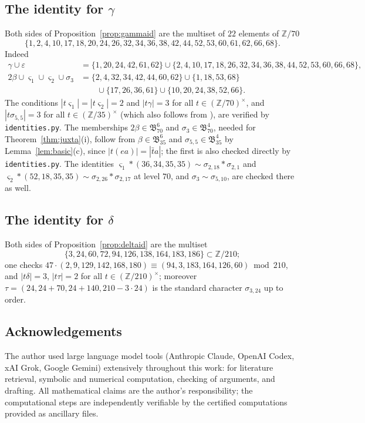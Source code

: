 \documentclass[11pt]{amsart}
\theoremstyle{definition}
\theoremstyle{remark}
\numberwithin{equation}{section}
\newcommand{\Z}{\mathbb{Z}}
\newcommand{\fB}{\mathfrak{B}}
\begin{document}
\subsection{\texorpdfstring{The identity for $\gamma$}{The identity for gamma}}
Both sides of Proposition~\ref{prop:gammaid} are the multiset of $22$ elements of $\Z/70$
\begin{equation}\label{eq:gammaid}
\{1,2,4,10,17,18,20,24,26,32,34,36,38,42,44,52,53,60,61,62,66,68\}.
\end{equation}
Indeed
\begin{align*}
\gamma\cup\varepsilon&=\{1,20,24,42,61,62\}\cup\{2,4,10,17,18,26,32,34,36,38,44,52,53,60,66,68\},\\
2\beta\cup\varsigma_1\cup\varsigma_2\cup\sigma_3&=\{2,4,32,34,42,44,60,62\}\cup\{1,18,53,68\}\\
&\qquad\cup\{17,26,36,61\}\cup\{10,20,24,38,52,66\}.
\end{align*}
The conditions $|t\varsigma_1|=|t\varsigma_2|=2$ and $|t\gamma|=3$ for all $t\in(\Z/70)^\times$, and $|t\sigma_{5,5}|=3$ for all $t\in(\Z/35)^\times$ (which also follows from \cite[p.~387]{Ao87}), are verified by \texttt{identities.py}. The memberships $2\beta\in\fB^6_{70}$ and $\sigma_3\in\fB^4_{70}$, needed for Theorem~\ref{thm:juxta}(i), follow from $\beta\in\fB^6_{35}$ and $\sigma_{5,5}\in\fB^4_{35}$ by Lemma~\ref{lem:basic}(c), since $|t(ea)|=|\bar ta|$; the first is also checked directly by \texttt{identities.py}. The identities $\varsigma_1*(36,34,35,35)\sim\sigma_{2,18}*\sigma_{2,1}$ and $\varsigma_2*(52,18,35,35)\sim\sigma_{2,26}*\sigma_{2,17}$ at level $70$, and $\sigma_3\sim\sigma_{5,10}$, are checked there as well.

\subsection{\texorpdfstring{The identity for $\delta$}{The identity for delta}}
Both sides of Proposition~\ref{prop:deltaid} are the multiset
\[
\{3,24,60,72,94,126,138,164,183,186\}\subset\Z/210;
\]
one checks $47\cdot(2,9,129,142,168,180)\equiv(94,3,183,164,126,60)\bmod210$, and $|t\delta|=3$, $|t\tau|=2$ for all $t\in(\Z/210)^\times$; moreover $\tau=(24,24+70,24+140,210-3\cdot24)$ is the standard character $\sigma_{3,24}$ up to order.


\subsection*{Acknowledgements}
The author used large language model tools (Anthropic Claude, OpenAI Codex, xAI Grok, Google Gemini) extensively throughout this work: for literature retrieval, symbolic and numerical computation, checking of arguments, and drafting. All mathematical claims are the author's responsibility; the computational steps are independently verifiable by the certified computations provided as ancillary files.
\end{document}
